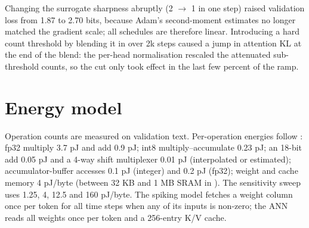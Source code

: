 \documentclass[10pt]{article}
\begin{document}
Changing the surrogate sharpness abruptly (2 $\to$ 1 in one step) raised validation loss from 1.87 to 2.70 bits,
because Adam's second-moment estimates no longer matched the gradient scale; all schedules are therefore linear.
Introducing a hard count threshold by blending it in over 2k steps caused a jump in attention KL at the end of the
blend: the per-head normalisation rescaled the attenuated sub-threshold counts, so the cut only took effect in the
last few percent of the ramp.

\section{Energy model}
\label{app:energy}

Operation counts are measured on validation text. Per-operation energies follow \citet{horowitz2014energy}: fp32
multiply 3.7 pJ and add 0.9 pJ; int8 multiply--accumulate 0.23 pJ; an 18-bit add 0.05 pJ and a 4-way shift
multiplexer 0.01 pJ (interpolated or estimated); accumulator-buffer accesses 0.1 pJ (integer) and 0.2 pJ (fp32);
weight and cache memory 4 pJ/byte (between 32 KB and 1 MB SRAM in \citep{horowitz2014energy}). The sensitivity
sweep uses 1.25, 4, 12.5 and 160 pJ/byte. The spiking model fetches a weight column once per token for all time
steps when any of its inputs is non-zero; the ANN reads all weights once per token and a 256-entry K/V cache.
\end{document}

